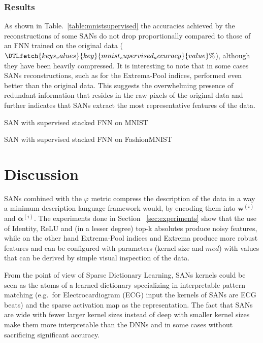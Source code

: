 \documentclass[journal]{IEEEtran}
\begin{document}
\subsubsection{Results}
As shown in Table.~\ref{table:mnistsupervised} the accuracies achieved by the reconstructions of some SANs do not drop proportionally compared to those of an FNN trained on the original data ($\DTLfetch{keys_values}{key}{mnist_supervised_accuracy}{value}\%$), although they have been heavily compressed.
It is interesting to note that in some cases SANs reconstructions, such as for the Extrema-Pool indices, performed even better than the original data.
This suggests the overwhelming presence of redundant information that resides in the raw pixels of the original data and further indicates that SANs extract the most representative features of the data.

\begin{table*}[!t]
	\centering
	\caption{SAN with supervised stacked FNN on MNIST}
	\label{table:mnistsupervised}
	\setlength\tabcolsep{4pt}
	
\end{table*}

\begin{table*}[!t]
	\centering
	\caption{SAN with supervised stacked FNN on FashionMNIST}
	\label{table:fashionmnistsupervised}
	\setlength\tabcolsep{4pt}
	
\end{table*}

\section{Discussion}
\label{sec:discussion}
SANs combined with the $\varphi$ metric compress the description of the data in a way a minimum description language framework would, by encoding them into $\bm{w}^{(i)}$ and $\bm{\alpha}^{(i)}$.
The experiments done in Section ~\ref{sec:experiments} show that the use of Identity, ReLU and (in a lesser degree) top-k absolutes produce noisy features, while on the other hand Extrema-Pool indices and Extrema produce more robust features and can be configured with parameters (kernel size and $med$) with values that can be derived by simple visual inspection of the data.

From the point of view of Sparse Dictionary Learning, SANs kernels could be seen as the atoms of a learned dictionary specializing in interpretable pattern matching (e.g.\ for Electrocardiogram (ECG) input the kernels of SANs are ECG beats) and the sparse activation map as the representation.
The fact that SANs are wide with fewer larger kernel sizes instead of deep with smaller kernel sizes make them more interpretable than the DNNs and in some cases without sacrificing significant accuracy.
\end{document}
